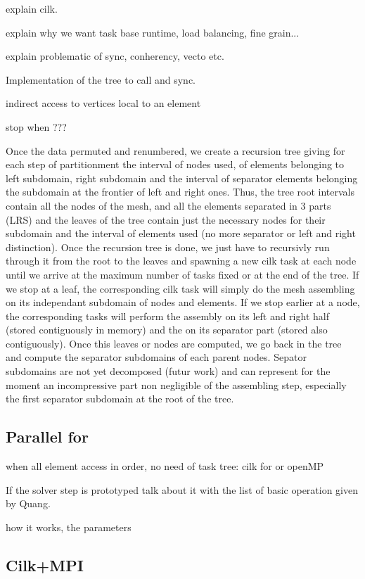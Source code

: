 \documentclass{IOS-Book-Article}
\begin{document}
explain cilk.

explain why we want task base runtime, load balancing, fine grain...

explain problematic of sync, conherency, vecto etc.


Implementation of the tree to call and sync.

indirect access to vertices local to an element

stop when ???

Once the data permuted and renumbered, we create a recursion tree giving for each step of partitionment the interval of nodes used, of elements belonging to left subdomain,
right subdomain and the interval of separator elements belonging the subdomain at the frontier of left and right ones.
Thus, the tree root intervals contain all  the nodes of the mesh, and all the elements separated in 3 parts (LRS) and the leaves of the tree contain just the necessary nodes
for their subdomain and the interval of elements used (no more separator or left and right distinction).
Once the recursion tree is done, we just have to recursivly run through it from the root to the leaves and spawning a new cilk task at each node until we arrive at the maximum
number of tasks fixed or at the end of the tree. If we stop at a leaf, the corresponding cilk task will simply do the mesh assembling on its independant subdomain of nodes and
elements. If we stop earlier at a node, the corresponding tasks will perform the assembly on its left and right half (stored contiguously in memory) and the on its separator
part (stored also contiguously). Once this leaves or nodes are computed, we go back in the tree and compute the separator subdomains of each parent nodes.
Sepator subdomains are not yet decomposed (futur work) and can represent for the moment an incompressive part non negligible of the assembling step, especially the first
separator subdomain at the root of the tree.

\subsection{Parallel for}

when all element access in order, no need of task tree: cilk for or openMP

If the solver step is prototyped talk about it with the list of basic operation given by Quang.

how it works, the parameters


\subsection{Cilk+MPI}
\end{document}
